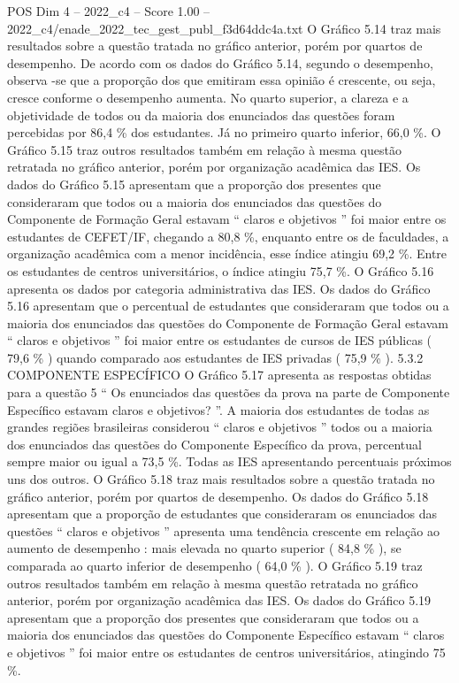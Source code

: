 \begin{textsample}{POS Dim 4 – 2022\_c4 – Score 1.00 – 2022\_c4/enade\_2022\_tec\_gest\_publ\_f3d64ddc4a.txt}
O Gráfico 5.14 traz mais resultados sobre a questão tratada no gráfico anterior, porém por quartos de desempenho.
De acordo com os dados do Gráfico 5.14, segundo o desempenho, observa -se que a proporção dos que emitiram essa opinião é crescente, ou seja, cresce conforme o desempenho aumenta.
No quarto superior, a clareza e a objetividade de todos ou da maioria dos enunciados das questões foram percebidas por 86,4 \% dos estudantes.
Já no primeiro quarto inferior, 66,0 \%.
O Gráfico 5.15 traz outros resultados também em relação à mesma questão retratada no gráfico anterior, porém por organização acadêmica das IES.
Os dados do Gráfico 5.15 apresentam que a proporção dos presentes que consideraram que todos ou a maioria dos enunciados das questões do Componente de Formação Geral estavam “ claros e objetivos ” foi maior entre os estudantes de CEFET/IF, chegando a 80,8 \%, enquanto entre os de faculdades, a organização acadêmica com a menor incidência, esse índice atingiu 69,2 \%.
Entre os estudantes de centros universitários, o índice atingiu 75,7 \%.
O Gráfico 5.16 apresenta os dados por categoria administrativa das IES.
Os dados do Gráfico 5.16 apresentam que o percentual de estudantes que consideraram que todos ou a maioria dos enunciados das questões do Componente de Formação Geral estavam “ claros e objetivos ” foi maior entre os estudantes de cursos de IES públicas ( 79,6 \% ) quando comparado aos estudantes de IES privadas ( 75,9 \% ). 5.3.2 COMPONENTE ESPECÍFICO O Gráfico 5.17 apresenta as respostas obtidas para a questão 5 “ Os enunciados das questões da prova na parte de Componente Específico estavam claros e objetivos? ”.
A maioria dos estudantes de todas as grandes regiões brasileiras considerou “ claros e objetivos ” todos ou a maioria dos enunciados das questões do Componente Específico da prova, percentual sempre maior ou igual a 73,5 \%.
Todas as IES apresentando percentuais próximos uns dos outros.
O Gráfico 5.18 traz mais resultados sobre a questão tratada no gráfico anterior, porém por quartos de desempenho.
Os dados do Gráfico 5.18 apresentam que a proporção de estudantes que consideraram os enunciados das questões “ claros e objetivos ” apresenta uma tendência crescente em relação ao aumento de desempenho : mais elevada no quarto superior ( 84,8 \% ), se comparada ao quarto inferior de desempenho ( 64,0 \% ).
O Gráfico 5.19 traz outros resultados também em relação à mesma questão retratada no gráfico anterior, porém por organização acadêmica das IES.
Os dados do Gráfico 5.19 apresentam que a proporção dos presentes que consideraram que todos ou a maioria dos enunciados das questões do Componente Específico estavam “ claros e objetivos ” foi maior entre os estudantes de centros universitários, atingindo 75 \%.

\end{textsample}
